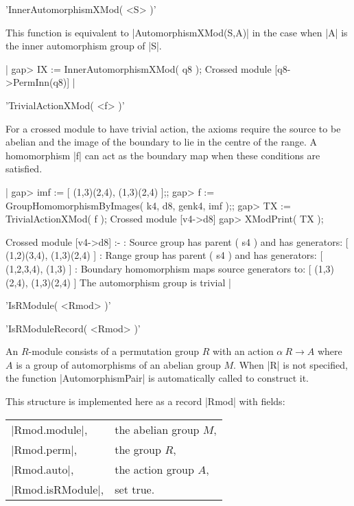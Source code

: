   
%

'InnerAutomorphismXMod( <S> )'

This function  is  equivalent to  |AutomorphismXMod(S,A)|  in the case
when |A| is the inner automorphism group of |S|.

|    gap> IX := InnerAutomorphismXMod( q8 );
    Crossed module [q8->PermInn(q8)]   |

%

'TrivialActionXMod( <f> )'

For a crossed  module to have trivial  action, the axioms require  the
source  to be  abelian and  the image of   the boundary to  lie in the
centre of the range.  A  homomorphism |f| can act  as the boundary map
when these conditions are satisfied.

|    gap> imf := [ (1,3)(2,4), (1,3)(2,4) ];;
    gap> f := GroupHomomorphismByImages( k4, d8, genk4, imf );;
    gap> TX := TrivialActionXMod( f );
    Crossed module [v4->d8]
    gap> XModPrint( TX );

    Crossed module [v4->d8] :- 
    : Source group has parent ( s4 ) and has generators:
      [ (1,2)(3,4), (1,3)(2,4) ]
    : Range group has parent ( s4 ) and has generators:
      [ (1,2,3,4), (1,3) ]
    : Boundary homomorphism maps source generators to:
      [ (1,3)(2,4), (1,3)(2,4) ]
      The automorphism group is trivial   |

%

'IsRModule( <Rmod> )'

'IsRModuleRecord( <Rmod> )'

An $R$-module consists of   a  permutation group  $R$ with  an  action
$\alpha \: R  \to  A$ where $A$  is  a group  of automorphisms  of  an
abelian    group  $M$.   When |R|   is    not specified,  the function
|AutomorphismPair| is automatically called to construct it.

This structure is implemented here as a record |Rmod| with fields:

\begin{tabular}{ll}
|Rmod.module|,     & the abelian group $M$,   \\
|Rmod.perm|,       & the group $R$,           \\
|Rmod.auto|,       & the action group $A$,    \\
|Rmod.isRModule|,  & set true.
\end{tabular}

